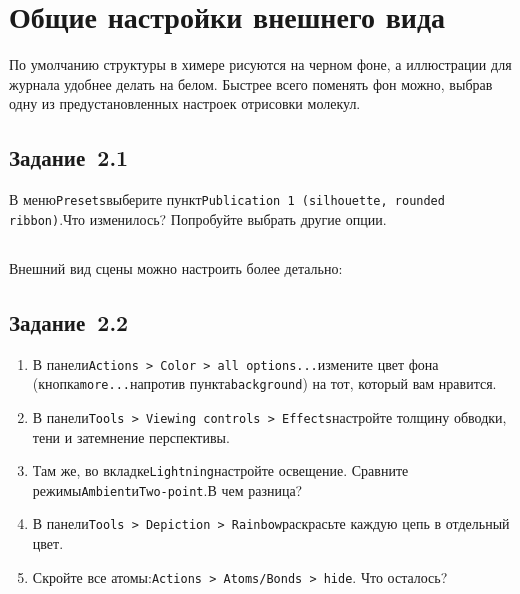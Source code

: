\section{Общие настройки внешнего вида}
По умолчанию структуры в химере рисуются на черном фоне, а иллюстрации для журнала удобнее делать на белом. Быстрее всего поменять фон можно, выбрав одну из предустановленных настроек отрисовки молекул.
\subsection*{Задание~2.1}
В меню\quad\texttt{Presets}\quad выберите пункт\quad\texttt{Publication~1 (silhouette, rounded ribbon)}.\quad Что изменилось? Попробуйте выбрать другие опции.
\subsection*{}
Внешний вид сцены можно настроить более детально:
\subsection*{Задание~2.2}
\begin{enumerate}
    \item В панели\quad\texttt{Actions~> Color~> all options...}\quad измените цвет фона (кнопка\quad\texttt{more...}\quad напротив пункта\quad\texttt{background}) на тот, который вам нравится.
    \item В панели\quad\texttt{Tools~> Viewing controls~> Effects}\quad настройте толщину обводки, тени и затемнение перспективы.
    \item Там же, во вкладке\quad\texttt{Lightning}\quad настройте освещение. Сравните режимы\quad\texttt{Ambient}\quad и\quad\texttt{Two-point}.\quad В чем разница?
    \item В панели\quad\texttt{Tools~> Depiction~> Rainbow}\quad раскрасьте каждую цепь в отдельный цвет.
    \item Скройте все атомы:\quad\texttt{Actions~> Atoms/Bonds~> hide}. Что осталось?
\end{enumerate}
